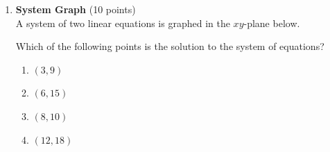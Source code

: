 \begin{enumerate}
  \newpage

  \item \textbf{System Graph} (10 points)\\
  A system of two linear equations is graphed in the $xy$-plane below.\\

  Which of the following points is the solution to the system of equations?\\
  \begin{enumerate}[label=(\Alph*)]
    \item $(3,9)$
    \item $(6,15)$
    \item $(8,10)$
    \item $(12,18)$
  \end{enumerate}
  \begin{subanswer}
  \end{subanswer}
\end{enumerate}